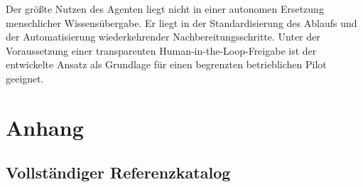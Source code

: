 \documentclass[
  10pt,
  ngerman,
  a4paper,
  toc=graduated,
  numbers=noenddot,
  headings=standardclasses
]{scrartcl}
\begin{document}
Der größte Nutzen des Agenten liegt nicht in einer autonomen Ersetzung menschlicher Wissensübergabe. Er liegt in der Standardisierung des Ablaufs und der Automatisierung wiederkehrender Nachbereitungsschritte. Unter der Voraussetzung einer transparenten Human-in-the-Loop-Freigabe ist der entwickelte Ansatz als Grundlage für einen begrenzten betrieblichen Pilot geeignet.

\newpage
{}
\begingroup
\raggedright


\endgroup

\newpage
\appendix
{}
\setcounter{page}{1}
\section{Anhang}

\subsection{Vollständiger Referenzkatalog}
\label{anhang_referenzkatalog}
\end{document}
